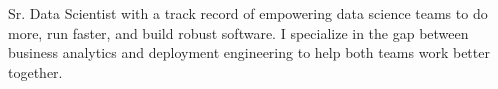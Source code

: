 
\begin{cvparagraph}

  Sr. Data Scientist with a track record of empowering data science teams to do
  more, run faster, and build robust software. I specialize in the gap between
  business analytics and deployment engineering to help both teams work better
  together.
\end{cvparagraph}
